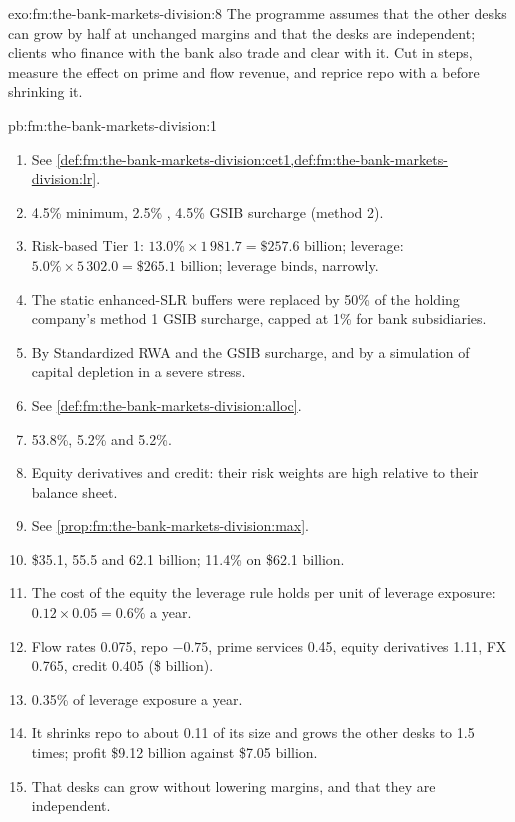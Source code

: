 \begin{solution}{exo:fm:the-bank-markets-division:8}
The programme assumes that the other desks can grow by half at unchanged margins and that the desks are independent; clients who finance with the
bank also trade and clear with it. Cut in steps, measure the effect on prime and flow revenue, and reprice repo with a 
before shrinking it.
\end{solution}

\begin{solution}{pb:fm:the-bank-markets-division:1}
\begin{enumerate}
\item See \cref{def:fm:the-bank-markets-division:cet1,def:fm:the-bank-markets-division:lr}.
\item 4.5\% minimum, 2.5\% , 4.5\% GSIB surcharge (method 2).
\item Risk-based Tier 1: $13.0\%\times1\,981.7=\$257.6$ billion; leverage: $5.0\%\times5\,302.0=\$265.1$ billion; leverage binds, narrowly.
\item The static enhanced-SLR buffers were replaced by 50\% of the holding company's method 1 GSIB surcharge, capped at 1\% for bank subsidiaries.
\item By Standardized RWA and the GSIB surcharge, and by a simulation of capital depletion in a severe stress.
\item See \cref{def:fm:the-bank-markets-division:alloc}.
\item 53.8\%, 5.2\% and 5.2\%.
\item Equity derivatives and credit: their risk weights are high relative to their balance sheet.
\item See \cref{prop:fm:the-bank-markets-division:max}.
\item \$35.1, 55.5 and 62.1 billion; 11.4\% on \$62.1 billion.
\item The cost of the equity the leverage rule holds per unit of leverage exposure: $0.12\times0.05=0.6\%$ a year.
\item Flow rates 0.075, repo $-0.75$, prime services 0.45, equity derivatives 1.11, FX 0.765, credit 0.405 (\$ billion).
\item 0.35\% of leverage exposure a year.
\item It shrinks repo to about 0.11 of its size and grows the other desks to 1.5 times; profit \$9.12 billion against \$7.05 billion.
\item That desks can grow without lowering margins, and that they are independent.

\end{enumerate}
\end{solution}
